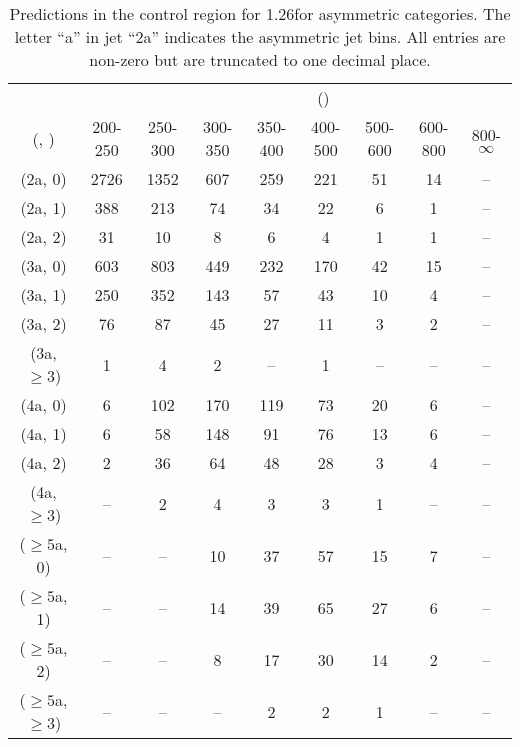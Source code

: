 \begin{table}[h!]
\tiny
\centering
\caption{Predictions in the \mj control region for 1.26\ifb for asymmetric categories. The letter ``a'' in jet \eg ``2a''  indicates the asymmetric jet bins. All entries are non-zero but are truncated to one decimal place.\label{tab:predsep_mu_data_asym}}
\begin{tabular}
{ccccccccc}
	\hline\hline
&	& \multicolumn{8}{c}{\scalht (\gev)} \\ 
	 (\njet,  \nb) & 200-250 & 250-300 & 300-350 & 350-400 & 400-500 & 500-600 & 600-800 & 800-$\infty$ \\ [0.8ex] 
\hline
	(2a, 0) & 2726 & 1352 & 607 & 259 & 221 & 51 & 14 & -- \\[0.5ex] 
	(2a, 1) & 388 & 213 & 74 & 34 & 22 & 6 & 1 & -- \\[0.5ex] 
	(2a, 2) & 31 & 10 & 8 & 6 & 4 & 1 & 1 & -- \\[0.5ex] 
	(3a, 0) & 603 & 803 & 449 & 232 & 170 & 42 & 15 & -- \\[0.5ex] 
	(3a, 1) & 250 & 352 & 143 & 57 & 43 & 10 & 4 & -- \\[0.5ex] 
	(3a, 2) & 76 & 87 & 45 & 27 & 11 & 3 & 2 & -- \\[0.5ex] 
	(3a, $\ge3$) & 1 & 4 & 2 & -- & 1 & -- & -- & -- \\[0.5ex] 
	(4a, 0) & 6 & 102 & 170 & 119 & 73 & 20 & 6 & -- \\[0.5ex] 
	(4a, 1) & 6 & 58 & 148 & 91 & 76 & 13 & 6 & -- \\[0.5ex] 
	(4a, 2) & 2 & 36 & 64 & 48 & 28 & 3 & 4 & -- \\[0.5ex] 
	(4a, $\ge3$) & -- & 2 & 4 & 3 & 3 & 1 & -- & -- \\[0.5ex] 
	($\ge5$a, 0) & -- & -- & 10 & 37 & 57 & 15 & 7 & -- \\[0.5ex] 
	($\ge5$a, 1) & -- & -- & 14 & 39 & 65 & 27 & 6 & -- \\[0.5ex] 
	($\ge5$a, 2) & -- & -- & 8 & 17 & 30 & 14 & 2 & -- \\[0.5ex] 
	($\ge5$a, $\ge3$) & -- & -- & -- & 2 & 2 & 1 & -- & -- \\[0.5ex] 
	\hline
	\hline
\end{tabular}
\end{table}
